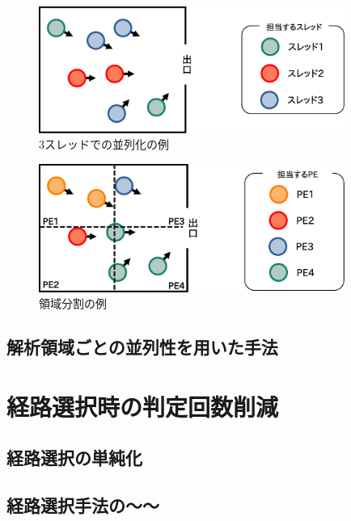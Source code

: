 \begin{figure}[hp]
 \begin{center}
  \includegraphics[width=10cm,clip]{figure/sureddo_heiretu.eps}
  \caption{3スレッドでの並列化の例}
  \label{fig:atigenshou}
 \end{center}
\end{figure}


\begin{figure}[hbtp]
 \begin{center}
  \includegraphics[width=10cm,clip]{figure/ryoiki_heiretu.eps}
  \caption{領域分割の例}
  \label{fig:atigenshou}
 \end{center}
\end{figure}


\clearpage

\subsection{解析領域ごとの並列性を用いた手法}

\section{経路選択時の判定回数削減}

\subsection{経路選択の単純化}

\subsection{経路選択手法の～～}




